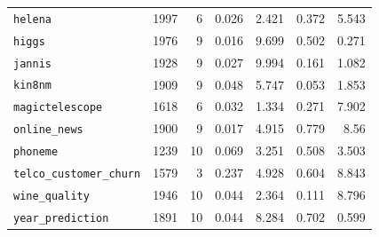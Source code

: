 \begin{table}[htbp]
\begin{tabular}{lrrrrrr}
\texttt{helena} & 1997 & 6 & 0.026 & 2.421 & 0.372 & 5.543 \\
\texttt{higgs} & 1976 & 9 & 0.016 & 9.699 & 0.502 & 0.271 \\
\texttt{jannis} & 1928 & 9 & 0.027 & 9.994 & 0.161 & 1.082 \\
\texttt{kin8nm} & 1909 & 9 & 0.048 & 5.747 & 0.053 & 1.853 \\
\texttt{magictelescope} & 1618 & 6 & 0.032 & 1.334 & 0.271 & 7.902 \\
\texttt{online\_news} & 1900 & 9 & 0.017 & 4.915 & 0.779 & 8.56 \\
\texttt{phoneme} & 1239 & 10 & 0.069 & 3.251 & 0.508 & 3.503 \\
\texttt{telco\_\allowbreak customer\_\allowbreak churn} & 1579 & 3 & 0.237 & 4.928 & 0.604 & 8.843 \\
\texttt{wine\_quality} & 1946 & 10 & 0.044 & 2.364 & 0.111 & 8.796 \\
\texttt{year\_\allowbreak prediction} & 1891 & 10 & 0.044 & 8.284 & 0.702 & 0.599 \\
\bottomrule
\end{tabular}
\end{table}

